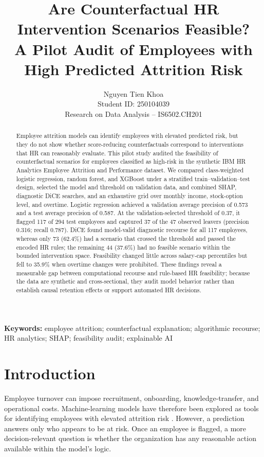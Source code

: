 \documentclass[11pt]{article}
\title{\textbf{Are Counterfactual HR Intervention Scenarios Feasible?\\A Pilot Audit of Employees with High Predicted Attrition Risk}}
\author{Nguyen Tien Khoa\\
Student ID: 250104039\\
Research on Data Analysis -- IS6502.CH201}
\date{}
\begin{document}
\maketitle

\begin{abstract}
Employee attrition models can identify employees with elevated predicted risk, but they do not show whether score-reducing counterfactuals correspond to interventions that HR can reasonably evaluate. This pilot study audited the feasibility of counterfactual scenarios for employees classified as high-risk in the synthetic IBM HR Analytics Employee Attrition and Performance dataset. We compared class-weighted logistic regression, random forest, and XGBoost under a stratified train--validation--test design, selected the model and threshold on validation data, and combined SHAP, diagnostic DiCE searches, and an exhaustive grid over monthly income, stock-option level, and overtime. Logistic regression achieved a validation average precision of 0.573 and a test average precision of 0.587. At the validation-selected threshold of 0.37, it flagged 117 of 294 test employees and captured 37 of the 47 observed leavers (precision 0.316; recall 0.787). DiCE found model-valid diagnostic recourse for all 117 employees, whereas only 73 (62.4\%) had a scenario that crossed the threshold and passed the encoded HR rules; the remaining 44 (37.6\%) had no feasible scenario within the bounded intervention space. Feasibility changed little across salary-cap percentiles but fell to 35.9\% when overtime changes were prohibited. These findings reveal a measurable gap between computational recourse and rule-based HR feasibility; because the data are synthetic and cross-sectional, they audit model behavior rather than establish causal retention effects or support automated HR decisions.
\end{abstract}

\noindent\textbf{Keywords:} employee attrition; counterfactual explanation; algorithmic recourse; HR analytics; SHAP; feasibility audit; explainable AI

\section{Introduction}
Employee turnover can impose recruitment, onboarding, knowledge-transfer, and operational costs. Machine-learning models have therefore been explored as tools for identifying employees with elevated attrition risk \cite{artelt2023,mohiuddin2023}. However, a prediction answers only who appears to be at risk. Once an employee is flagged, a more decision-relevant question is whether the organization has any reasonable action available within the model's logic.
\end{document}
